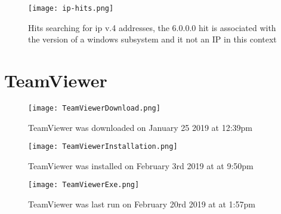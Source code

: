 \documentclass[
	letterpaper, %
	10pt, %
	unnumberedsections, %
	twoside, %
]{APAAssignment}
\begin{document}
\begin{appendices}
	\begin{figure}[!h] %
		\centering
		\texttt{[image: ip-hits.png]}
		\caption{Hits searching for ip v.4 addresses, the 6.0.0.0 hit is associated with the version of a windows subsystem and it not an IP in this context}
		\label{fig:IpHits}
	\end{figure}

	\section{TeamViewer}\label{app:TeamViewer}

	\begin{figure}[!h] %
		\centering
		\texttt{[image: TeamViewerDownload.png]}
		\caption{TeamViewer was downloaded on January 25 2019 at 12:39pm}
		\label{fig:TeamViewerDownload}
	\end{figure}

	\begin{figure}[!h] %
		\centering
		\texttt{[image: TeamViewerInstallation.png]}
		\caption{TeamViewer was installed on February 3rd 2019 at at 9:50pm}
		\label{fig:TeamViewerInstallation}
	\end{figure}


	\begin{figure}[!h] %
		\centering
		\texttt{[image: TeamViewerExe.png]}
		\caption{TeamViewer was last run on February 20rd 2019 at at 1:57pm}
		\label{fig:TeamViewerexe}
	\end{figure}




\end{appendices}
\end{document}
